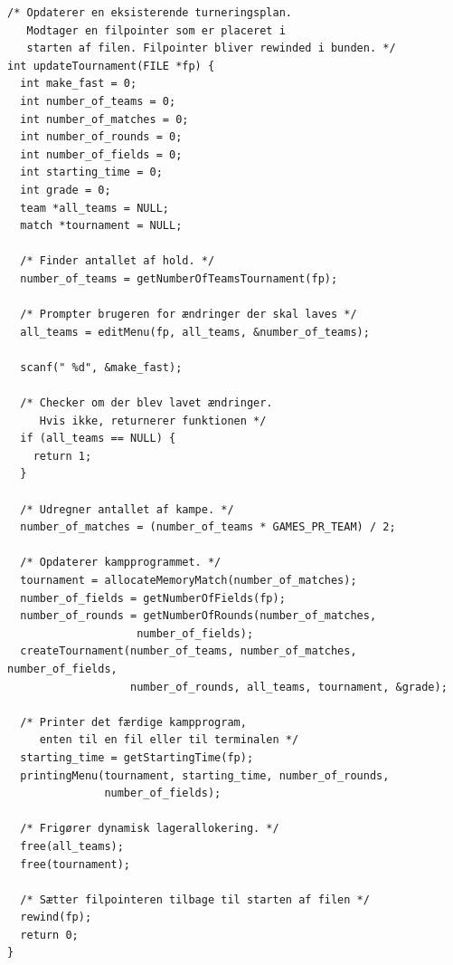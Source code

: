\begin{listing}[H]
\begin{verbatim}
/* Opdaterer en eksisterende turneringsplan.
   Modtager en filpointer som er placeret i 
   starten af filen. Filpointer bliver rewinded i bunden. */
int updateTournament(FILE *fp) {
  int make_fast = 0;
  int number_of_teams = 0;
  int number_of_matches = 0;
  int number_of_rounds = 0;
  int number_of_fields = 0;
  int starting_time = 0;
  int grade = 0;
  team *all_teams = NULL;
  match *tournament = NULL;

  /* Finder antallet af hold. */
  number_of_teams = getNumberOfTeamsTournament(fp);

  /* Prompter brugeren for ændringer der skal laves */
  all_teams = editMenu(fp, all_teams, &number_of_teams);

  scanf(" %d", &make_fast);

  /* Checker om der blev lavet ændringer. 
     Hvis ikke, returnerer funktionen */
  if (all_teams == NULL) {
    return 1;
  }

  /* Udregner antallet af kampe. */
  number_of_matches = (number_of_teams * GAMES_PR_TEAM) / 2;

  /* Opdaterer kampprogrammet. */
  tournament = allocateMemoryMatch(number_of_matches);
  number_of_fields = getNumberOfFields(fp);
  number_of_rounds = getNumberOfRounds(number_of_matches,
                    number_of_fields);
  createTournament(number_of_teams, number_of_matches, number_of_fields,
                   number_of_rounds, all_teams, tournament, &grade);

  /* Printer det færdige kampprogram, 
     enten til en fil eller til terminalen */
  starting_time = getStartingTime(fp);
  printingMenu(tournament, starting_time, number_of_rounds, 
               number_of_fields);

  /* Frigører dynamisk lagerallokering. */
  free(all_teams);
  free(tournament);

  /* Sætter filpointeren tilbage til starten af filen */
  rewind(fp);
  return 0;
}
\end{verbatim}
\label{code:updateTournament}
\end{listing}


